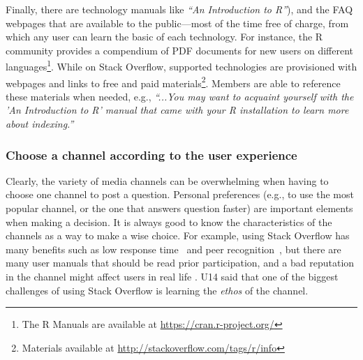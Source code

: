 \documentclass{sig-alternate-05-2015}
\begin{document}
		Finally, there are technology manuals like \textit{``An Introduction to R''}), and the FAQ webpages that are available to the public---most of the time free of charge, from which any user can learn the basic of each technology.
		For instance, the R community provides a compendium of PDF documents for new users on different languages\footnote{The R Manuals are available at \url{https://cran.r-project.org/}}.
		While on Stack Overflow, supported technologies are provisioned with webpages and links to free and paid materials\footnote{Materials available at \url{http://stackoverflow.com/tags/r/info}}.
		Members are able to reference these materials when needed, e.g., \textit{``...You may want to acquaint yourself with the 'An Introduction to R' manual that came with your R installation to learn more about indexing.''}


	\subsubsection{Choose a channel according to the user experience}

		Clearly, the variety of media channels can be overwhelming when having to choose one channel to post a question.
		Personal preferences (e.g., to use the most popular channel, or the one that answers question faster) are important elements when making a decision.
		It is always good to know the characteristics of the channels as a way to make a wise choice.
		For example, using Stack Overflow has many benefits such as low response time~\cite{Mamykina2011} and peer recognition~\cite{Singer2013}, but there are many user manuals that should be read prior participation, and a bad reputation in the channel might affect users in real life \cite{Singer2013}.
		U14 said that one of the biggest challenges of using Stack Overflow is learning the \emph{ethos} of the channel.
\end{document}
